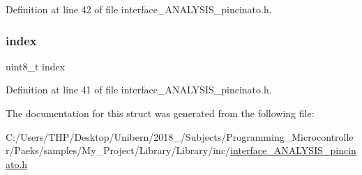 Definition at line 42 of file interface\+\_\+\+A\+N\+A\+L\+Y\+S\+I\+S\+\_\+pincinato.\+h.

\mbox{\label{struct_data_buffer___aae5a12e607d0f782506d9e6ec6179c64}} 
\subsubsection{\texorpdfstring{index}{index}}
{\footnotesize\ttfamily uint8\+\_\+t index}



Definition at line 41 of file interface\+\_\+\+A\+N\+A\+L\+Y\+S\+I\+S\+\_\+pincinato.\+h.



The documentation for this struct was generated from the following file\+:\begin{DoxyCompactItemize}
\item 
C\+:/\+Users/\+T\+H\+P/\+Desktop/\+Unibern/2018\+\_/\+Subjects/\+Programming\+\_\+\+Microcontroller/\+Paeks/samples/\+My\+\_\+\+Project/\+Library/\+Library/inc/\mbox{\hyperlink{interface___a_n_a_l_y_s_i_s__pincinato_8h}{interface\+\_\+\+A\+N\+A\+L\+Y\+S\+I\+S\+\_\+pincinato.\+h}}\end{DoxyCompactItemize}
